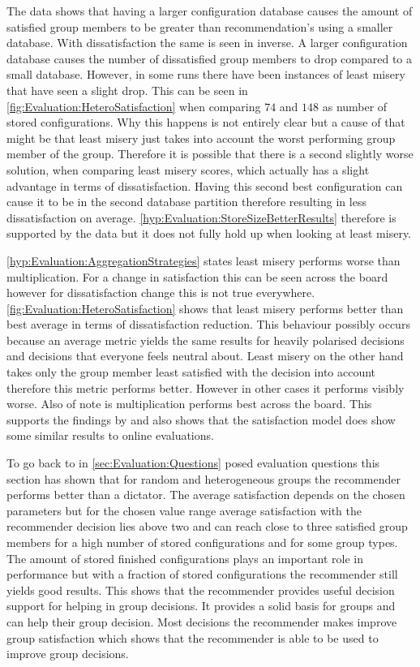 The data shows that having a larger configuration database causes the amount of satisfied group members to be greater than recommendation's using a smaller database. With dissatisfaction the same is seen in inverse. A larger configuration database causes the number of dissatisfied group members to drop compared to a small database. However, in some runs there have been instances of least misery that have seen a slight drop. This can be seen in \autoref{fig:Evaluation:HeteroSatisfaction} when comparing $74$ and $148$ as number of stored configurations. Why this happens is not entirely clear but a cause of that might be that least misery just takes into account the worst performing group member of the group. Therefore it is possible that there is a second slightly worse solution, when comparing least misery scores, which actually has a slight advantage in terms of dissatisfaction. Having this second best configuration can cause it to be in the second database partition therefore resulting in less dissatisfaction on average. \autoref{hyp:Evaluation:StoreSizeBetterResults} therefore is supported by the data but it does not fully hold up when looking at least misery.

\autoref{hyp:Evaluation:AggregationStrategies} states least misery performs worse than multiplication. For a change in satisfaction this can be seen across the board however for dissatisfaction change this is not true everywhere. \autoref{fig:Evaluation:HeteroSatisfaction} shows that least misery performs better than best average in terms of dissatisfaction reduction. This behaviour possibly occurs because an average metric yields the same results for heavily polarised decisions and decisions that everyone feels neutral about. Least misery on the other hand takes only the group member least satisfied with the decision into account therefore this metric performs better. However in other cases it performs visibly worse. Also of note is multiplication performs best across the board. This supports the findings by \citeauthor{Masthoff2015} \cite[p. 755f]{Masthoff2015} and also shows that the satisfaction model does show some similar results to online evaluations.


To go back to in \autoref{sec:Evaluation:Questions} posed evaluation questions this section has shown that for random and heterogeneous groups the recommender performs better than a dictator. The average satisfaction depends on the chosen parameters but for the chosen value range average satisfaction with the recommender decision lies above two and can reach close to three satisfied group members for a high number of stored configurations and for some group types. The amount of stored finished configurations plays an important role in performance but with a fraction of stored configurations the recommender still yields good results. This shows that the recommender provides useful decision support for helping in group decisions. It provides a solid basis for groups and can help their group decision. Most decisions the recommender makes improve group satisfaction which shows that the recommender is able to be used to improve group decisions.